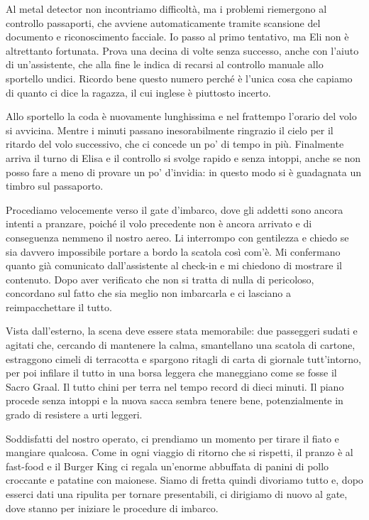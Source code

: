 Al metal detector non incontriamo difficoltà, ma i problemi riemergono al controllo passaporti, che avviene automaticamente tramite scansione del documento e riconoscimento facciale. Io passo al primo tentativo, ma Eli non è altrettanto fortunata. Prova una decina di volte senza successo, anche con l'aiuto di un'assistente, che alla fine le indica di recarsi al controllo manuale allo sportello undici. Ricordo bene questo numero perché è l'unica cosa che capiamo di quanto ci dice la ragazza, il cui inglese è piuttosto incerto.

Allo sportello la coda è nuovamente lunghissima e nel frattempo l'orario del volo si avvicina. Mentre i minuti passano inesorabilmente ringrazio il cielo per il ritardo del volo successivo, che ci concede un po' di tempo in più. Finalmente arriva il turno di Elisa e il controllo si svolge rapido e senza intoppi, anche se non posso fare a meno di provare un po' d'invidia: in questo modo si è guadagnata un timbro sul passaporto.

Procediamo velocemente verso il gate d'imbarco, dove gli addetti sono ancora intenti a pranzare, poiché il volo precedente non è ancora arrivato e di conseguenza nemmeno il nostro aereo. Li interrompo con gentilezza e chiedo se sia davvero impossibile portare a bordo la scatola così com'è. Mi confermano quanto già comunicato dall'assistente al check-in e mi chiedono di mostrare il contenuto. Dopo aver verificato che non si tratta di nulla di pericoloso, concordano sul fatto che sia meglio non imbarcarla e ci lasciano a reimpacchettare il tutto.

Vista dall'esterno, la scena deve essere stata memorabile: due passeggeri sudati e agitati che, cercando di mantenere la calma, smantellano una scatola di cartone, estraggono cimeli di terracotta e spargono ritagli di carta di giornale tutt'intorno, per poi infilare il tutto in una borsa leggera che maneggiano come se fosse il Sacro Graal. Il tutto chini per terra nel tempo record di dieci minuti. Il piano procede senza intoppi e la nuova sacca sembra tenere bene, potenzialmente in grado di resistere a urti leggeri.

Soddisfatti del nostro operato, ci prendiamo un momento per tirare il fiato e mangiare qualcosa. Come in ogni viaggio di ritorno che si rispetti, il pranzo è al fast-food e il Burger King ci regala un'enorme abbuffata di panini di pollo croccante e patatine con maionese. Siamo di fretta quindi divoriamo tutto e, dopo esserci dati una ripulita per tornare presentabili, ci dirigiamo di nuovo al gate, dove stanno per iniziare le procedure di imbarco.

